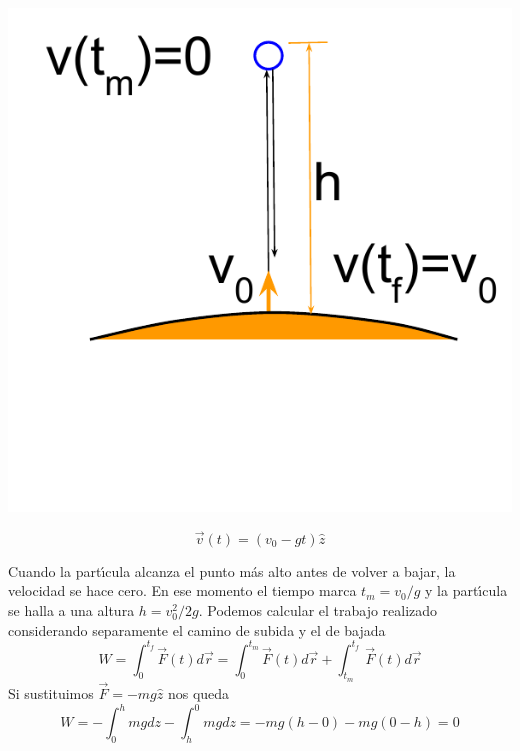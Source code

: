 

\begin{marginfigure}
  \includegraphics[width=\linewidth]{ParticulaVertical.pdf}
  \caption{Una part\'\i{}cula es lanzada verticalmente hacia arriba con una velocidad inical de $v_{0}$, alcanza una altura m\'axima y vuelve a caer.}
  \label{fig:particula_campo_gravitatorio}
\end{marginfigure}

\begin{equation}
\vec{v}(t)=(v_{0}-gt)\hat{z}
\label{eq:particula_vertical_2}
\end{equation}

Cuando la part\'\i{}cula alcanza el punto m\'as alto antes de volver a bajar, la velocidad se hace cero. En ese momento el tiempo marca $t_m=v_0/g$ y la part\'\i{}cula se halla a una altura $h=v_0^2/2g$. Podemos calcular el trabajo realizado considerando separamente el camino de subida y el de bajada
\begin{equation}
W=\int_{0}^{t_f} \vec{F}(t)d\vec{r}=\int_{0}^{t_m} \vec{F}(t)d\vec{r}+\int_{t_m}^{t_f} \vec{F}(t)d\vec{r}
\label{eq:particula_vertical_trabajo}
\end{equation}
Si sustituimos $\vec{F}=-mg\hat{z}$ nos queda
\begin{equation}
W=-\int_{0}^{h} mg dz-\int_{h}^{0} mg dz=-mg(h-0)-mg(0-h)=0
\label{eq:particula_vertical_trabajo_2}
\end{equation}

